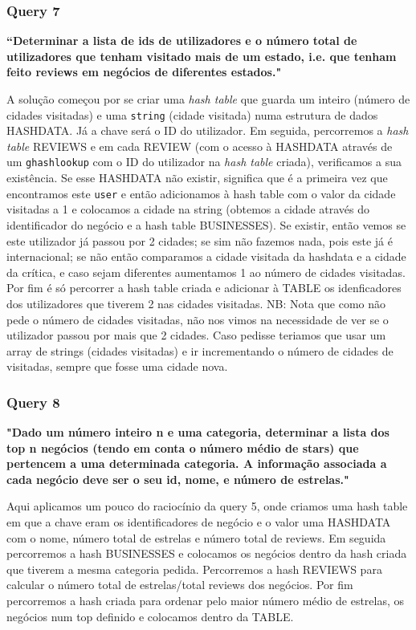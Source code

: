 \documentclass[a4paper]{article}
\begin{document}
\subsubsection*{Query 7}
\label{sec:query7}

\textbf{“Determinar a lista de ids de utilizadores e o número total de utilizadores que
tenham visitado mais de um estado, i.e. que tenham feito reviews em negócios de diferentes
estados."}

A solução começou por se criar uma \textit{hash table} que guarda um inteiro (número de cidades visitadas) e uma \texttt{string} (cidade visitada) numa estrutura de dados HASHDATA. Já a chave será o ID do utilizador. Em seguida, percorremos a \textit{hash table} REVIEWS e em cada REVIEW (com o acesso à HASHDATA através de um \texttt{g\textunderscore hash\textunderscore lookup} com o ID do utilizador na \textit{hash table} criada), verificamos a sua existência. Se esse HASHDATA não existir, significa que é a primeira vez que encontramos este \texttt{user} e então adicionamos à hash table com o valor da cidade visitadas a 1 e colocamos a cidade na string (obtemos a cidade através do identificador do negócio e a hash table BUSINESSES). Se existir, então vemos se este utilizador já passou por 2 cidades; se sim não fazemos nada, pois este já é internacional; se não então comparamos a cidade visitada da hashdata e a cidade da crítica, e caso sejam diferentes aumentamos 1 ao número de cidades visitadas. Por fim é só percorrer a hash table criada e adicionar à TABLE os idenficadores dos utilizadores que tiverem 2 nas cidades visitadas. NB: Nota que como não pede o número de cidades visitadas, não nos vimos na necessidade de ver se o utilizador passou por mais que 2 cidades. Caso pedisse teriamos que usar um array de strings (cidades visitadas) e ir incrementando o número de cidades de visitadas, sempre que fosse uma cidade nova.

\subsubsection*{Query 8}
\label{sec:query8}

\textbf{"Dado um número inteiro n e uma categoria, determinar a lista dos top n negócios
(tendo em conta o número médio de stars) que pertencem a uma determinada categoria. A
informação associada a cada negócio deve ser o seu id, nome, e número de estrelas."}

Aqui aplicamos um pouco do raciocínio da query 5, onde criamos uma hash table em que a chave eram os identificadores de negócio e o valor uma HASHDATA com o nome, número total de estrelas e número total de reviews. Em seguida percorremos a hash BUSINESSES e colocamos os negócios dentro da hash criada que tiverem a mesma categoria pedida. Percorremos a hash REVIEWS para calcular o número total de estrelas/total reviews dos negócios. Por fim percorremos a hash criada para ordenar pelo maior número médio de estrelas, os negócios num top definido e colocamos dentro da TABLE.
\end{document}

